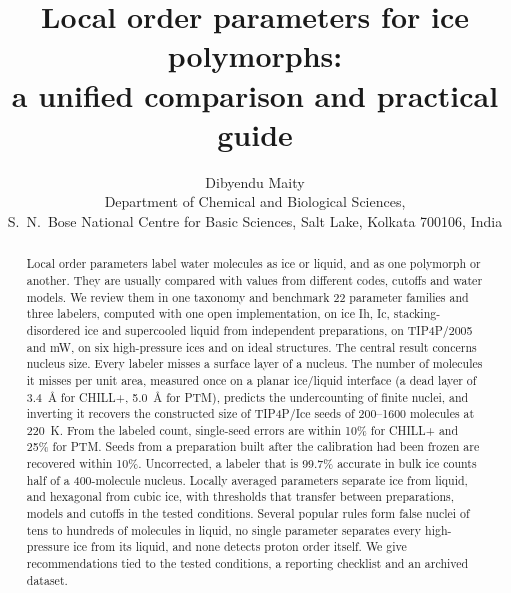 \documentclass[11pt,a4paper]{article}
\title{Local order parameters for ice polymorphs:\\a unified comparison and practical guide}
\author{Dibyendu Maity\\[2pt]
\small Department of Chemical and Biological Sciences,\\
\small S.~N.~Bose National Centre for Basic Sciences, Salt Lake, Kolkata 700106, India}
\date{}
\begin{document}
\maketitle

\begin{abstract}
Local order parameters label water molecules as ice or liquid, and as one
polymorph or another. They are usually compared with values from different
codes, cutoffs and water models. We review them in one taxonomy and benchmark
22 parameter families and three labelers, computed with one open
implementation, on ice Ih, Ic, stacking-disordered ice and supercooled liquid
from independent preparations, on TIP4P/2005 and mW, on six high-pressure
ices and on ideal structures. The central result concerns nucleus size. Every
labeler misses a surface layer of a nucleus. The number of molecules it
misses per unit area, measured once on a planar ice/liquid interface (a dead
layer of 3.4~\AA{} for CHILL+, 5.0~\AA{} for PTM), predicts the undercounting
of finite nuclei, and inverting it recovers the constructed size of TIP4P/Ice
seeds of 200--1600 molecules at 220~K. From the labeled count, single-seed
errors are within 10\% for CHILL+ and 25\% for PTM. Seeds from a preparation
built after the calibration had been frozen are recovered within 10\%.
Uncorrected, a labeler that is 99.7\% accurate in bulk ice counts half of a
400-molecule nucleus. Locally averaged parameters separate ice from liquid,
and hexagonal from cubic ice, with thresholds that transfer between
preparations, models and cutoffs in the tested conditions. Several popular
rules form false nuclei of tens to hundreds of molecules in liquid, no single
parameter separates every high-pressure ice from its liquid, and none detects
proton order itself. We give recommendations tied to the tested conditions, a
reporting checklist and an archived dataset.
\end{abstract}

\tableofcontents
\newpage

\end{document}
